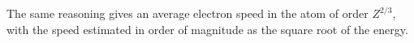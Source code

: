 The same reasoning gives an average electron speed in the atom of order $Z^{2/3}$, with the speed estimated in order of magnitude as the square root of the energy.

